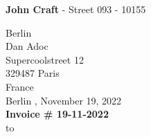 \documentclass[12pt, letterpaper]{article}
\newcommand*{\helveticaFont}{\fontfamily{phv}\selectfont}
\newcommand*{\normalFont}{\fontfamily{ppl}\selectfont}
\newcommand{\myName}{
\textbf{John Craft}%
}
\newcommand{\myAddress}{
{Street 093}%
}
\newcommand{\myCity}{
{Berlin}%
}
\newcommand{\myPostalCode}{
{10155}%
}
\begin{document}
\pagecolor{backgroundColor}
{\bfseries\helveticaFont \myName}
\normalFont  -{\myAddress } -\myPostalCode \myCity\\
\vspace{0.6cm}
{Dan Adoc}\\%
{Supercoolstreet 12}\\%
{329487 Paris}\\%
{France}\\%
\vspace{0.5cm}
\hspace*{\fill}\myCity,
 {November 19, 2022}\\%
\vspace{0.5cm}
{\Large\bfseries Invoice \#\ignorespaces
{19-11-2022} %
}\\
\vspace{-2pt}
\hbox to 
\vspace{-2pt}
\end{document}

